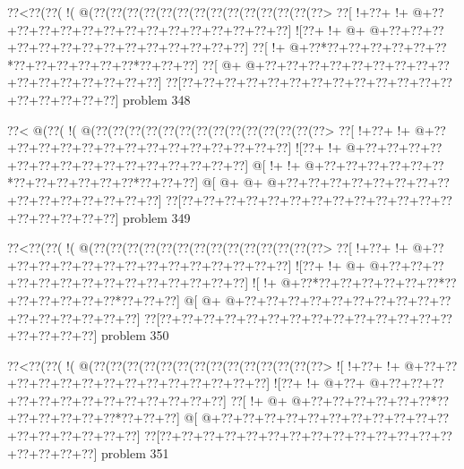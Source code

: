 \vbox{\vbox{\goo
\0??<\0??(\0??(\- !(\- @(\0??(\0??(\0??(\0??(\0??(\0??(\0??(\0??(\0??(\0??(\0??(\0??(\0??(\0??>
\0??[\- !+\0??+\- !+\- @+\0??+\0??+\0??+\0??+\0??+\0??+\0??+\0??+\0??+\0??+\0??+\0??+\0??+\0??]
\- ![\0??+\- !+\- @+\- @+\0??+\0??+\0??+\0??+\0??+\0??+\0??+\0??+\0??+\0??+\0??+\0??+\0??+\0??]
\0??[\- !+\- @+\0??*\0??+\0??+\0??+\0??+\0??+\0??*\0??+\0??+\0??+\0??+\0??+\0??*\0??+\0??+\0??]
\0??[\- @+\- @+\0??+\0??+\0??+\0??+\0??+\0??+\0??+\0??+\0??+\0??+\0??+\0??+\0??+\0??+\0??+\0??]
\0??[\0??+\0??+\0??+\0??+\0??+\0??+\0??+\0??+\0??+\0??+\0??+\0??+\0??+\0??+\0??+\0??+\0??+\0??]
}
\hfil problem 348\hfil\break
}



\vbox{\vbox{\goo
\0??<\- @(\0??(\- !(\- @(\0??(\0??(\0??(\0??(\0??(\0??(\0??(\0??(\0??(\0??(\0??(\0??(\0??(\0??>
\0??[\- !+\0??+\- !+\- @+\0??+\0??+\0??+\0??+\0??+\0??+\0??+\0??+\0??+\0??+\0??+\0??+\0??+\0??]
\- ![\0??+\- !+\- @+\0??+\0??+\0??+\0??+\0??+\0??+\0??+\0??+\0??+\0??+\0??+\0??+\0??+\0??+\0??]
\- @[\- !+\- !+\- @+\0??+\0??+\0??+\0??+\0??+\0??*\0??+\0??+\0??+\0??+\0??+\0??*\0??+\0??+\0??]
\- @[\- @+\- @+\- @+\0??+\0??+\0??+\0??+\0??+\0??+\0??+\0??+\0??+\0??+\0??+\0??+\0??+\0??+\0??]
\0??[\0??+\0??+\0??+\0??+\0??+\0??+\0??+\0??+\0??+\0??+\0??+\0??+\0??+\0??+\0??+\0??+\0??+\0??]
}
\hfil problem 349\hfil\break
}



\vbox{\vbox{\goo
\0??<\0??(\0??(\- !(\- @(\0??(\0??(\0??(\0??(\0??(\0??(\0??(\0??(\0??(\0??(\0??(\0??(\0??(\0??>
\0??[\- !+\0??+\- !+\- @+\0??+\0??+\0??+\0??+\0??+\0??+\0??+\0??+\0??+\0??+\0??+\0??+\0??+\0??]
\- ![\0??+\- !+\- @+\- @+\0??+\0??+\0??+\0??+\0??+\0??+\0??+\0??+\0??+\0??+\0??+\0??+\0??+\0??]
\- ![\- !+\- @+\0??*\0??+\0??+\0??+\0??+\0??+\0??*\0??+\0??+\0??+\0??+\0??+\0??*\0??+\0??+\0??]
\- @[\- @+\- @+\0??+\0??+\0??+\0??+\0??+\0??+\0??+\0??+\0??+\0??+\0??+\0??+\0??+\0??+\0??+\0??]
\0??[\0??+\0??+\0??+\0??+\0??+\0??+\0??+\0??+\0??+\0??+\0??+\0??+\0??+\0??+\0??+\0??+\0??+\0??]
}
\hfil problem 350\hfil\break
}



\vbox{\vbox{\goo
\0??<\0??(\0??(\- !(\- @(\0??(\0??(\0??(\0??(\0??(\0??(\0??(\0??(\0??(\0??(\0??(\0??(\0??(\0??>
\- ![\- !+\0??+\- !+\- @+\0??+\0??+\0??+\0??+\0??+\0??+\0??+\0??+\0??+\0??+\0??+\0??+\0??+\0??]
\- ![\0??+\- !+\- @+\0??+\- @+\0??+\0??+\0??+\0??+\0??+\0??+\0??+\0??+\0??+\0??+\0??+\0??+\0??]
\0??[\- !+\- @+\- @+\0??+\0??+\0??+\0??+\0??+\0??*\0??+\0??+\0??+\0??+\0??+\0??*\0??+\0??+\0??]
\- @[\- @+\0??+\0??+\0??+\0??+\0??+\0??+\0??+\0??+\0??+\0??+\0??+\0??+\0??+\0??+\0??+\0??+\0??]
\0??[\0??+\0??+\0??+\0??+\0??+\0??+\0??+\0??+\0??+\0??+\0??+\0??+\0??+\0??+\0??+\0??+\0??+\0??]
}
\hfil problem 351\hfil\break
}



